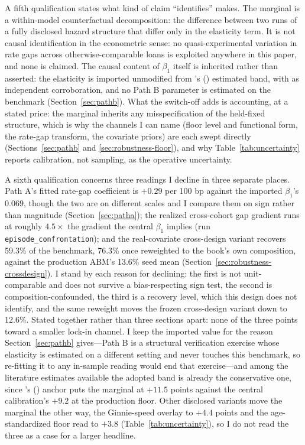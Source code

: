 \documentclass[12pt]{article}
\newcommand{\citepos}[1]{\citeauthor{#1}'s (\citeyear{#1})}
\begin{document}
A fifth qualification states what kind of claim ``identifies'' makes. The marginal is a within-model counterfactual decomposition: the difference between two runs of a fully disclosed hazard structure that differ only in the elasticity term. It is not causal identification in the econometric sense: no quasi-experimental variation in rate gaps across otherwise-comparable loans is exploited anywhere in this paper, and none is claimed. The causal content of $\beta_1$ itself is inherited rather than asserted: the elasticity is imported unmodified from \citepos{liebersohn2024} estimated band, with \citet{fonseca2024} as independent corroboration, and no Path B parameter is estimated on the benchmark (Section~\ref{sec:pathb}). What the switch-off adds is accounting, at a stated price: the marginal inherits any misspecification of the held-fixed structure, which is why the channels I can name (floor level and functional form, the rate-gap transform, the covariate priors) are each swept directly (Sections~\ref{sec:pathb} and \ref{sec:robustness-floor}), and why Table~\ref{tab:uncertainty} reports calibration, not sampling, as the operative uncertainty.

A sixth qualification concerns three readings I decline in three separate places. Path A's fitted rate-gap coefficient is $+0.29$ per 100 bp against the imported $\beta_1$'s $0.069$, though the two are on different scales and I compare them on sign rather than magnitude (Section~\ref{sec:patha}); the realized cross-cohort gap gradient runs at roughly $4.5\times$ the gradient the central $\beta_1$ implies (run \texttt{episode\_confrontation}); and the real-covariate cross-design variant recovers 59.3\% of the benchmark, 76.3\% once reweighted to the book's own composition, against the production ABM's 13.6\% seed mean (Section~\ref{sec:robustness-crossdesign}). I stand by each reason for declining: the first is not unit-comparable and does not survive a bias-respecting sign test, the second is composition-confounded, the third is a recovery level, which this design does not identify, and the same reweight moves the frozen cross-design variant down to 12.6\%. Stated together rather than three sections apart: none of the three points toward a smaller lock-in channel. I keep the imported value for the reason Section~\ref{sec:pathb} gives---Path B is a structural verification exercise whose elasticity is estimated on a different setting and never touches this benchmark, so re-fitting it to any in-sample reading would end that exercise---and among the literature estimates available the adopted band is already the conservative one, since \citepos{fonseca2024} anchor puts the marginal at $+11.5$ points against the central calibration's $+9.2$ at the production floor. Other disclosed variants move the marginal the other way, the Ginnie-speed overlay to $+4.4$ points and the age-standardized floor read to $+3.8$ (Table~\ref{tab:uncertainty}), so I do not read the three as a case for a larger headline.
\end{document}
